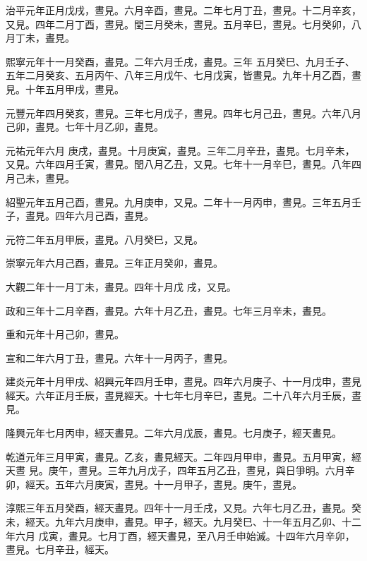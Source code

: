 \begin{pinyinscope}
 治平元年正月戊戌，晝見。六月辛酉，晝見。二年七月丁丑，晝見。十二月辛亥，又見。四年二月丁酉，晝見。閏三月癸未，晝見。五月辛巳，晝見。七月癸卯，八月丁未，晝見。



 熙寧元年十一月癸酉，晝見。二年六月壬戌，晝見。三年
 五月癸巳、九月壬子、五年二月癸亥、五月丙午、八年三月戊午、七月戊寅，皆晝見。九年十月乙酉，晝見。十年五月甲戌，晝見。



 元豐元年四月癸亥，晝見。三年七月戊子，晝見。四年七月己丑，晝見。六年八月己卯，晝見。七年十月乙卯，晝見。



 元祐元年六月
 庚戌，晝見。十月庚寅，晝見。三年二月辛丑，晝見。七月辛未，又見。六年四月壬寅，晝見。閏八月乙丑，又見。七年十一月辛巳，晝見。八年四月己未，晝見。



 紹聖元年五月己酉，晝見。九月庚申，又見。二年十一月丙申，晝見。三年五月壬子，晝見。四年六月己酉，晝見。



 元符二年五月甲辰，晝見。八月癸巳，又見。



 崇寧元年六月己酉，晝見。三年正月癸卯，晝見。



 大觀二年十一月丁未，晝見。四年十月戊
 戌，又見。



 政和三年十二月辛酉，晝見。六年十月乙丑，晝見。七年三月辛未，晝見。



 重和元年十月己卯，晝見。



 宣和二年六月丁丑，晝見。六年十一月丙子，晝見。



 建炎元年十月甲戌、紹興元年四月壬申，晝見。四年六月庚子、十一月戊申，晝見經天。六年正月壬辰，晝見經天。十七年七月辛巳，晝見。二十八年六月壬辰，晝見。



 隆興元年七月丙申，經天晝見。二年六月戊辰，晝見。七月庚子，經天晝見。



 乾道元年三月甲寅，晝見。乙亥，晝見經天。二年四月甲申，晝見。五月甲寅，經天晝
 見。庚午，晝見。三年九月戊子，四年五月乙丑，晝見，與日爭明。六月辛卯，經天。五年六月庚寅，晝見。十一月甲子，晝見。庚午，晝見。



 淳熙三年五月癸酉，經天晝見。四年十一月壬戌，又見。六年七月乙丑，晝見。癸未，經天。九年六月庚申，晝見。甲子，經天。九月癸巳、十一年五月乙卯、十二年六月
 戊寅，晝見。七月丁酉，經天晝見，至八月壬申始滅。十四年六月辛卯，晝見。七月辛丑，經天。




\end{pinyinscope}
